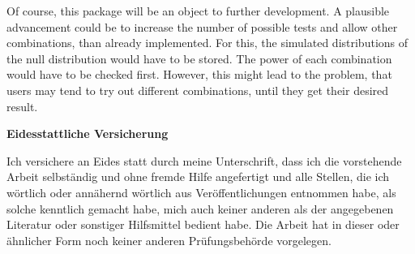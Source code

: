 \documentclass[11pt,a4paper]{article}
\begin{document}
Of course, this package will be an object to further development. A
plausible advancement could be to increase the number of possible tests
and allow other combinations, than already implemented. For this, the
simulated distributions of the null distribution would have to be
stored. The power of each combination would have to be checked first.
However, this might lead to the problem, that users may tend to try out
different combinations, until they get their desired result.

\newpage
\renewcommand*{\mkbibnamefamily}[1]{\textbf{#1}}
\renewcommand*{\mkbibnamegiven}[1]{\textbf{#1}}
\renewcommand*{\mkbibnameprefix}[1]{\textbf{#1}}
\renewcommand*{\mkbibnamesuffix}[1]{\textbf{#1}}
\printbibliography[title=References]

\newpage
\textbf{Eidesstattliche Versicherung}

\bigskip

Ich versichere an Eides statt durch meine Unterschrift, dass ich die vorstehende Arbeit selbständig und ohne fremde Hilfe angefertigt und alle Stellen, die ich wörtlich oder annähernd wörtlich aus Veröffentlichungen entnommen habe, als solche kenntlich gemacht habe, mich auch keiner anderen als der angegebenen Literatur oder sonstiger Hilfsmittel bedient habe. Die Arbeit hat in dieser oder ähnlicher Form noch keiner anderen Prüfungsbehörde vorgelegen.

\vspace{1cm}
\rule{0pt}{2\baselineskip} %
\par\noindent{} \hfill\makebox[2.25in]{\hrulefill}%
\par\noindent\makebox[2.25in][l]{} \hfill{}%
\end{document}
